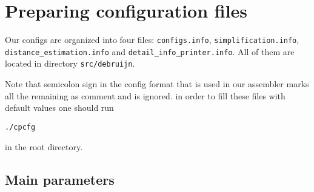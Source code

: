 \documentclass{article}
\begin{document}
\section{Preparing configuration files}
Our configs are organized into four files: {\tt configs.info}, {\tt simplification.info}, {\tt distance\_estimation.info} and {\tt detail\_info\_printer.info}. 
All of them are located in directory {\tt src/debruijn}.

Note that semicolon sign in the config format that is used in our assembler marks all the remaining as comment and is ignored.
in order to fill these files with default values one should run
\begin{lstlisting}
./cpcfg
\end{lstlisting}
in the root directory.

\subsection{Main parameters}
\end{document}
